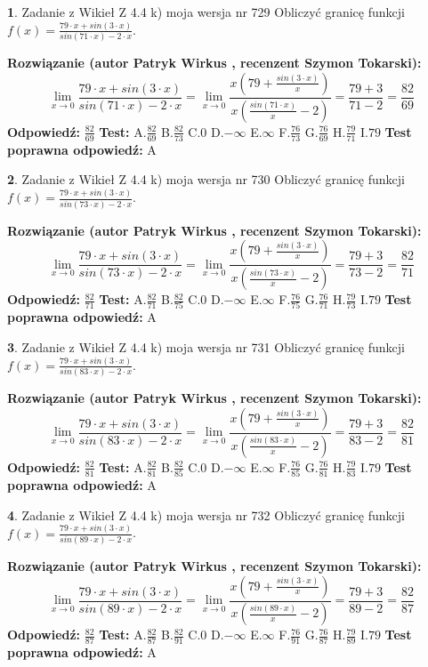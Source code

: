 \documentclass[12pt, a4paper]{article}
\theoremstyle{definition} %
\newtheorem{zad}{}
\newcommand{\zadStart}[1]{\begin{zad}#1\newline}
\newcommand{\zadStop}{\end{zad}}
\newcommand{\rozwStart}[2]{\noindent \textbf{Rozwiązanie (autor #1 , recenzent #2): }\newline}
\newcommand{\rozwStop}{\newline}
\newcommand{\odpStart}{\noindent \textbf{Odpowiedź:}\newline}
\newcommand{\odpStop}{\newline}
\newcommand{\testStart}{\noindent \textbf{Test:}\newline}
\newcommand{\testStop}{\newline}
\newcommand{\kluczStart}{\noindent \textbf{Test poprawna odpowiedź:}\newline}
\newcommand{\kluczStop}{\newline}
\begin{document}
\zadStart{Zadanie z Wikieł Z 4.4 k) moja wersja nr 729}
Obliczyć granicę funkcji $f(x)=\frac{79\cdot x +sin(3\cdot x)}{sin(71\cdot x) -2\cdot x}$.
\zadStop
\rozwStart{Patryk Wirkus}{Szymon Tokarski}
$$\lim\limits_{x\to 0}\frac{79\cdot x +sin(3\cdot x)}{sin(71\cdot x) -2\cdot x}
=\lim\limits_{x\to 0}\frac{x(79+\frac{sin(3\cdot x)}{x})}{x(\frac{sin(71\cdot x)}{x}-2)}
=\frac{79+3}{71-2} = \frac{82}{69}$$
\rozwStop
\odpStart
$\frac{82}{69}$
\odpStop
\testStart
A.$\frac{82}{69}$
B.$\frac{82}{73}$
C.$0$
D.$-\infty$
E.$\infty$
F.$\frac{76}{73}$
G.$\frac{76}{69}$
H.$\frac{79}{71}$
I.$79$
\testStop
\kluczStart
A
\kluczStop



\zadStart{Zadanie z Wikieł Z 4.4 k) moja wersja nr 730}
Obliczyć granicę funkcji $f(x)=\frac{79\cdot x +sin(3\cdot x)}{sin(73\cdot x) -2\cdot x}$.
\zadStop
\rozwStart{Patryk Wirkus}{Szymon Tokarski}
$$\lim\limits_{x\to 0}\frac{79\cdot x +sin(3\cdot x)}{sin(73\cdot x) -2\cdot x}
=\lim\limits_{x\to 0}\frac{x(79+\frac{sin(3\cdot x)}{x})}{x(\frac{sin(73\cdot x)}{x}-2)}
=\frac{79+3}{73-2} = \frac{82}{71}$$
\rozwStop
\odpStart
$\frac{82}{71}$
\odpStop
\testStart
A.$\frac{82}{71}$
B.$\frac{82}{75}$
C.$0$
D.$-\infty$
E.$\infty$
F.$\frac{76}{75}$
G.$\frac{76}{71}$
H.$\frac{79}{73}$
I.$79$
\testStop
\kluczStart
A
\kluczStop



\zadStart{Zadanie z Wikieł Z 4.4 k) moja wersja nr 731}
Obliczyć granicę funkcji $f(x)=\frac{79\cdot x +sin(3\cdot x)}{sin(83\cdot x) -2\cdot x}$.
\zadStop
\rozwStart{Patryk Wirkus}{Szymon Tokarski}
$$\lim\limits_{x\to 0}\frac{79\cdot x +sin(3\cdot x)}{sin(83\cdot x) -2\cdot x}
=\lim\limits_{x\to 0}\frac{x(79+\frac{sin(3\cdot x)}{x})}{x(\frac{sin(83\cdot x)}{x}-2)}
=\frac{79+3}{83-2} = \frac{82}{81}$$
\rozwStop
\odpStart
$\frac{82}{81}$
\odpStop
\testStart
A.$\frac{82}{81}$
B.$\frac{82}{85}$
C.$0$
D.$-\infty$
E.$\infty$
F.$\frac{76}{85}$
G.$\frac{76}{81}$
H.$\frac{79}{83}$
I.$79$
\testStop
\kluczStart
A
\kluczStop



\zadStart{Zadanie z Wikieł Z 4.4 k) moja wersja nr 732}
Obliczyć granicę funkcji $f(x)=\frac{79\cdot x +sin(3\cdot x)}{sin(89\cdot x) -2\cdot x}$.
\zadStop
\rozwStart{Patryk Wirkus}{Szymon Tokarski}
$$\lim\limits_{x\to 0}\frac{79\cdot x +sin(3\cdot x)}{sin(89\cdot x) -2\cdot x}
=\lim\limits_{x\to 0}\frac{x(79+\frac{sin(3\cdot x)}{x})}{x(\frac{sin(89\cdot x)}{x}-2)}
=\frac{79+3}{89-2} = \frac{82}{87}$$
\rozwStop
\odpStart
$\frac{82}{87}$
\odpStop
\testStart
A.$\frac{82}{87}$
B.$\frac{82}{91}$
C.$0$
D.$-\infty$
E.$\infty$
F.$\frac{76}{91}$
G.$\frac{76}{87}$
H.$\frac{79}{89}$
I.$79$
\testStop
\kluczStart
A
\kluczStop
\end{document}
